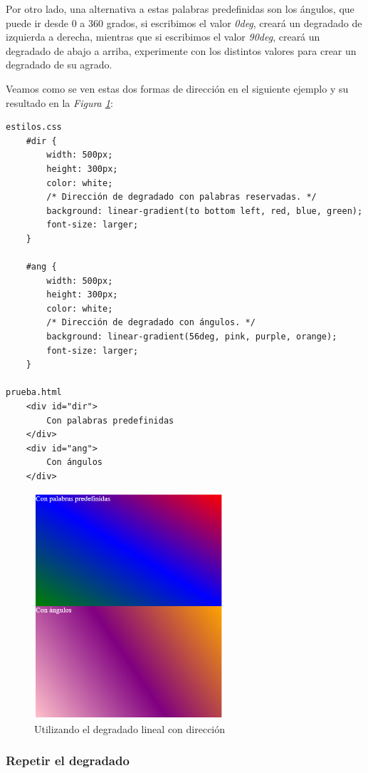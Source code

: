 Por otro lado, una alternativa a estas palabras predefinidas son los ángulos, que puede ir desde 0 a 360 grados, si escribimos el valor \textit{0deg}, creará un degradado de izquierda a derecha, mientras que si escribimos el valor \textit{90deg}, creará un degradado de abajo a arriba, experimente con los distintos valores para crear un degradado de su agrado.

Veamos como se ven estas dos formas de dirección en el siguiente ejemplo y su resultado en la \textit{Figura \ref{fig: 44}}:
\begin{lstlisting}
estilos.css
    #dir {
        width: 500px; 
        height: 300px;
        color: white;  
        /* Dirección de degradado con palabras reservadas. */
        background: linear-gradient(to bottom left, red, blue, green);
        font-size: larger;
    }
    
    #ang {
        width: 500px; 
        height: 300px;
        color: white;
        /* Dirección de degradado con ángulos. */
        background: linear-gradient(56deg, pink, purple, orange);
        font-size: larger;
    }

prueba.html
    <div id="dir">
        Con palabras predefinidas
    </div>
    <div id="ang">
        Con ángulos
    </div>
\end{lstlisting}
\begin{figure}[H]
    \centering
    \caption{Utilizando el degradado lineal con dirección}
    \label{fig: 44}
    \includegraphics[width=7cm]{ss/linear-gradient-3.png}
\end{figure}


\subsubsection{Repetir el degradado}

